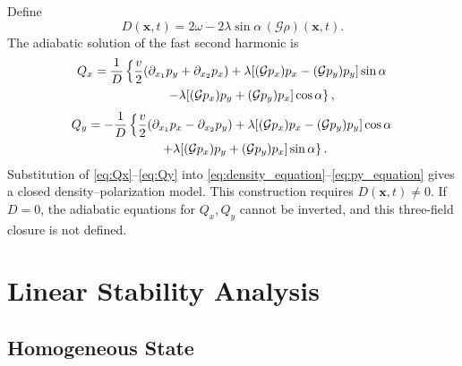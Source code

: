 \documentclass[11pt]{article}
\numberwithin{equation}{section}
\begin{document}
Define
\begin{equation}
  D(\mathbf x,t)=
  2\omega-2\lambda\sin\alpha\,(\mathcal G\rho)(\mathbf x,t).
\end{equation}
The adiabatic solution of the fast second harmonic is
\begin{align}
  Q_x&=
  \frac{1}{D}
  \left\{
  \frac{v}{2}(\partial_{x_1}p_y+\partial_{x_2}p_x)
  +\lambda[(\mathcal Gp_x)p_x-(\mathcal Gp_y)p_y]\sin\alpha \right. \nonumber\\
  &\hspace{5.8em}\left.
  -\lambda[(\mathcal Gp_x)p_y+(\mathcal Gp_y)p_x]\cos\alpha
  \right\},
  \label{eq:Qx}
\end{align}
\begin{align}
  Q_y&=
  -\frac{1}{D}
  \left\{
  \frac{v}{2}(\partial_{x_1}p_x-\partial_{x_2}p_y)
  +\lambda[(\mathcal Gp_x)p_x-(\mathcal Gp_y)p_y]\cos\alpha \right. \nonumber\\
  &\hspace{5.8em}\left.
  +\lambda[(\mathcal Gp_x)p_y+(\mathcal Gp_y)p_x]\sin\alpha
  \right\}.
  \label{eq:Qy}
\end{align}
Substitution of \eqref{eq:Qx}--\eqref{eq:Qy} into
\eqref{eq:density_equation}--\eqref{eq:py_equation} gives a closed
density--polarization model. This construction requires
$D(\mathbf x,t)\ne0$. If $D=0$, the adiabatic equations for $Q_x,Q_y$
cannot be inverted, and this three-field closure is not defined.

\section{Linear Stability Analysis}

\subsection{Homogeneous State}
\end{document}
